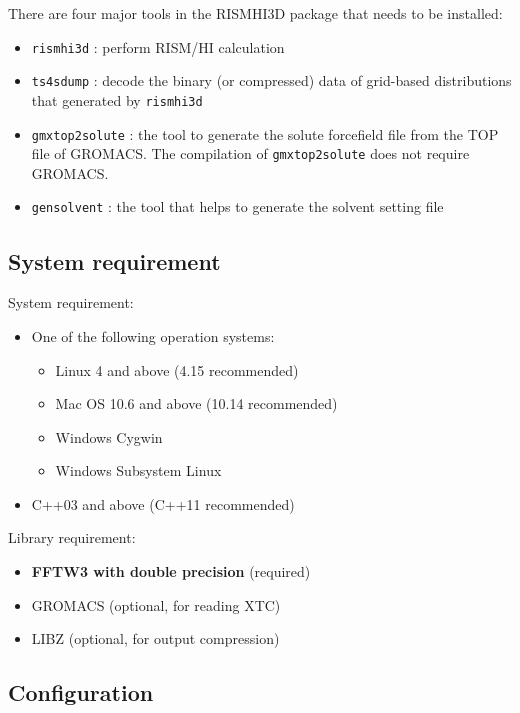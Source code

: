 \documentclass[aip,amsmath,amssymb,reprint,onecolumn]{revtex4-1}
\begin{document}
There are four major tools in the RISMHI3D package that needs to be installed:

\begin{itemize}
    \item \texttt{rismhi3d} : perform RISM/HI calculation
    \item \texttt{ts4sdump} : decode the binary (or compressed) data of grid-based distributions that generated by \texttt{rismhi3d}
    \item \texttt{gmxtop2solute} : the tool to generate the solute forcefield file from the TOP file of GROMACS. The compilation of \texttt{gmxtop2solute} does not require GROMACS.
    \item \texttt{gensolvent} : the tool that helps to generate the solvent setting file
\end{itemize}

\subsection{System requirement}

System requirement:

\begin{itemize}
    \item One of the following operation systems:
    \begin{itemize}
        \item Linux 4 and above (4.15 recommended)
        \item Mac OS 10.6 and above (10.14 recommended)
        \item Windows Cygwin
        \item Windows Subsystem Linux
    \end{itemize}
    \item C++03 and above (C++11 recommended)
\end{itemize}

Library requirement:

\begin{itemize}
    \item {\bf FFTW3 with double precision} (required)
    \item GROMACS (optional, for reading XTC)
    \item LIBZ (optional, for output compression)
\end{itemize}

\subsection{Configuration}
\end{document}
